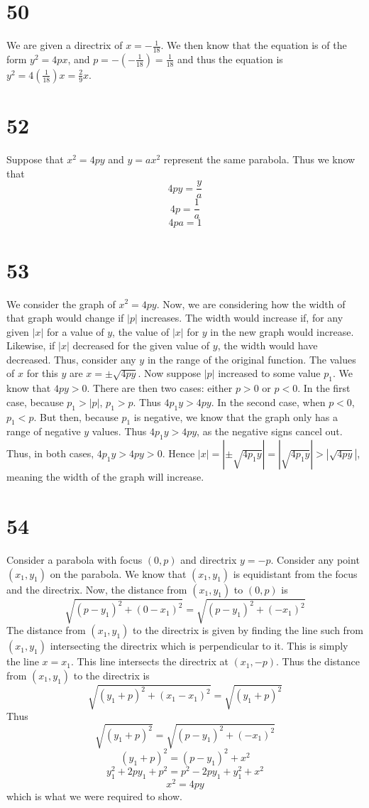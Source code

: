 \documentclass{article}
\theoremstyle{definition}
\newcommand{\?}{\stackrel{?}{=}}
\begin{document}
\section*{50}
We are given a directrix of $x=-\frac{1}{18}$. We then know that the equation is of the form $y^2=4px$, and 
$p=-(-\frac{1}{18})=\frac{1}{18}$ and thus the equation is $y^2=4(\frac{1}{18})x=\frac{2}{9}x$.

\section*{52}
Suppose that $x^2=4py$ and $y=ax^2$ represent the same parabola. Thus we know that \[ 4py=\frac{y}{a} \] \[ 4p=\frac{1}{a} \] \[ 4pa=1 \]

\section*{53}
We consider the graph of $x^2=4py$. Now, we are considering how the width of that graph would change if $|p|$ increases. The width would increase if, for any given $|x|$ for a value of $y$, 
the value of $|x|$ for $y$ in the new graph would increase. Likewise, if $|x|$ decreased for the given value of $y$, the width would have decreased. Thus, consider any $y$ in the range of the 
original function. The values of $x$ for this $y$ are $x=\pm\sqrt{4py}$. Now suppose $|p|$ increased to some value $p_1$. We know that $4py>0$. There are then two cases: either 
$p>0$ or $p<0$. In the first case, because $p_1>|p|$, $p_1>p$. Thus $4p_1y>4py$. In the second case, when $p<0$, $p_1<p$. But then, because $p_1$ is 
negative, we know that the graph only has a range of negative $y$ values. Thus $4p_1y>4py$, as the negative signs cancel out. Thus, in both cases, $4p_1y>4py>0$. 
Hence $|x|=|\pm\sqrt{4p_1y}|=|\sqrt{4p_1y}|>|\sqrt{4py}|$, meaning the width of the graph will increase.

\section*{54}
Consider a parabola with focus $(0,p)$ and directrix $y=-p$. Consider any point $(x_1,y_1)$ on the parabola. We know that $(x_1,y_1)$ is equidistant from the focus and the directrix.
Now, the distance from $(x_1,y_1)$ to $(0,p)$ is \[ \sqrt{(p-y_1)^2+(0-x_1)^2}=\sqrt{(p-y_1)^2+(-x_1)^2} \] The distance from $(x_1,y_1)$ to the directrix is given by finding the line such from 
$(x_1,y_1)$ 
intersecting the directrix which is perpendicular to it. This is simply the line $x=x_1$. This line intersects the directrix at $(x_1,-p)$. Thus the distance from $(x_1,y_1)$ to the directrix 
is \[ \sqrt{(y_1+p)^2+(x_1-x_1)^2}=\sqrt{(y_1+p)^2} \] Thus \[ \sqrt{(y_1+p)^2}=\sqrt{(p-y_1)^2+(-x_1)^2} \]
\[ (y_1+p)^2=(p-y_1)^2+x^2 \] \[ y_1^2+2py_1+p^2=p^2-2py_1+y_1^2+x^2 \] \[ x^2=4py \] which is what we were required to show.
\end{document}
